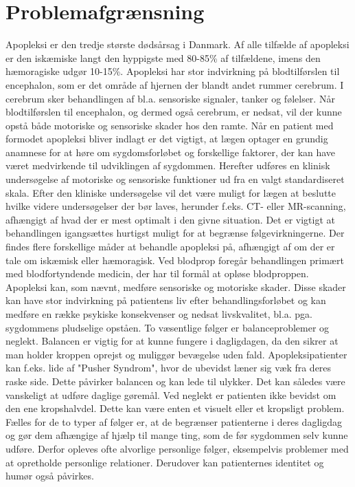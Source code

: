 \section{Problemafgrænsning}
Apopleksi er den tredje største dødsårsag i Danmark. 
Af alle tilfælde af apopleksi er den iskæmiske langt den hyppigste med 80-85\% af tilfældene, imens den hæmoragiske udgør 10-15\%.
Apopleksi har stor indvirkning på blodtilførslen til encephalon, som er det område af hjernen der blandt andet rummer cerebrum. I cerebrum sker behandlingen af bl.a. sensoriske signaler, tanker og følelser. Når blodtilførslen til encephalon, og dermed også cerebrum, er nedsat, vil der kunne opstå både motoriske og sensoriske skader hos den ramte. 
Når en patient med formodet apopleksi bliver indlagt er det vigtigt, at lægen optager en grundig anamnese for at høre om sygdomsforløbet og forskellige faktorer, der kan have været medvirkende til udviklingen af sygdommen. Herefter udføres en klinisk undersøgelse af motoriske og sensoriske funktioner ud fra en valgt standardiseret skala. Efter den kliniske undersøgelse vil det være muligt for lægen at beslutte hvilke videre undersøgelser der bør laves, herunder f.eks. CT- eller MR-scanning, afhængigt af hvad der er mest optimalt i den givne situation. Det er vigtigt at behandlingen igangsættes hurtigst muligt for at begrænse følgevirkningerne. Der findes flere forskellige måder at behandle apopleksi på, afhængigt af om der er tale om iskæmisk eller hæmoragisk. Ved blodprop foregår behandlingen primært med blodfortyndende medicin, der har til formål at opløse blodproppen.
Apopleksi kan, som nævnt, medføre sensoriske og motoriske skader. Disse skader kan have stor indvirkning på patientens liv efter behandlingsforløbet og kan medføre en række psykiske konsekvenser og nedsat livskvalitet, bl.a. pga. sygdommens pludselige opståen.
To væsentlige følger er balanceproblemer og neglekt. Balancen er vigtig for at kunne fungere i dagligdagen, da den sikrer at man holder kroppen oprejst og muliggør bevægelse uden fald. Apopleksipatienter kan f.eks. lide af "Pusher Syndrom", hvor de ubevidst læner sig væk fra deres raske side. Dette påvirker balancen og kan lede til ulykker. Det kan således være vanskeligt at udføre daglige gøremål. Ved neglekt er patienten ikke bevidst om den ene kropshalvdel. Dette kan være enten et visuelt eller et kropsligt problem.
Fælles for de to typer af følger er, at de begrænser patienterne i deres dagligdag og gør dem afhængige af hjælp til mange ting, som de før sygdommen selv kunne udføre. Derfor opleves ofte alvorlige personlige følger, eksempelvis problemer med at opretholde personlige relationer. Derudover kan patienternes identitet og humør også påvirkes. 

